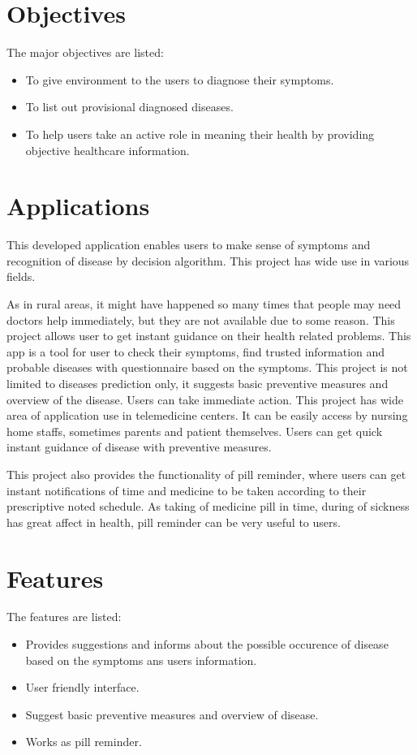 \section{Objectives}\label{sec:obj}%
The major objectives are listed:
\begin{itemize}
    \item To give environment to the users to diagnose their symptoms. 
    \item To list out provisional diagnosed diseases.
    \item To help users take an active role in meaning their health by providing objective healthcare information.
\end{itemize}
\section{Applications}\label{sec:app}%
This developed application enables users to make sense of symptoms and recognition of disease by decision algorithm. This project has wide use in various fields.\par
As in rural areas, it might have happened so many times that people may need doctors help immediately, but they are not available due to some reason. This project allows user to get instant guidance on their health related problems. This app is a tool for user to check their symptoms, find trusted information and probable diseases with questionnaire based on the symptoms. This project is not limited to diseases prediction only, it suggests basic preventive measures and overview of the disease. Users can take immediate action. This project has wide area of application use in telemedicine centers. It can be easily access by nursing home staffs, sometimes parents and patient themselves. Users can get quick instant guidance of disease with preventive measures.\par
This project also provides the functionality of pill reminder, where users can get instant  notifications of time and medicine to be taken according to their prescriptive noted schedule. As taking of medicine pill in time, during of sickness has great affect in health, pill reminder can be very useful to users.

\pagebreak
\section{Features}\label{sec:feat}%
The features are listed: 
\begin{itemize}
    \item Provides suggestions and informs about the possible occurence of disease based on the symptoms ans users information.
    \item User friendly interface.
    \item Suggest basic preventive measures and overview of disease.
    \item Works as pill reminder.
\end{itemize}
